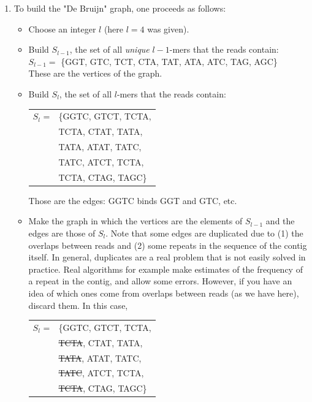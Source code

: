 \documentclass[a4paper,11pt]{article}
\begin{document}
\begin{enumerate}
\item To build the "De Bruijn" graph, one proceeds as follows:
	\begin{itemize}
	\item Choose an integer $l$ (here $l=4$ was given). 
	\item Build $S_{l-1}$, the set of all \textit{unique} $l-1$-mers that the reads contain:\\
		$S_{l-1}=$ \{GGT, GTC, TCT, CTA, TAT, ATA, ATC, TAG, AGC\}\\
		These are the vertices of the graph.
	\item Build $S_l$, the set of all $l$-mers that the reads contain:\\
		\begin{tabular}{ll}
		$S_l$ = & \{GGTC, GTCT, TCTA,\\
		              &  TCTA, CTAT, TATA,\\
		              &  TATA, ATAT, TATC,\\
		              &  TATC, ATCT, TCTA,\\
		              &  TCTA, CTAG, TAGC\}
		\end{tabular}
		
		Those are the edges: GGTC binds GGT and GTC, etc. 
	\item Make the graph in which the vertices are the elements of $S_{l-1}$ and the edges are those of $S_l$. Note that some edges are duplicated due to (1) the overlaps between reads and (2) some repeats in the sequence of the contig itself. In general, duplicates are a real problem that is not easily solved in practice. Real algorithms for example make estimates of the frequency of a repeat in the contig, and allow some errors. However, if you have an idea of which ones come from overlaps between reads (as we have here), discard them. In this case,  
	
			\begin{tabular}{ll}
		         $S_l$ = & \{GGTC, GTCT, TCTA,\\
		              &  \sout{TCTA}, CTAT, TATA,\\
		              &  \sout{TATA}, ATAT, TATC,\\
		              &  \sout{TATC}, ATCT, TCTA,\\
		              &  \sout{TCTA}, CTAG, TAGC\}
		        \end{tabular}       
		        

\end{itemize}
\end{enumerate}
\end{document}
